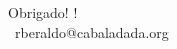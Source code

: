 
\begin{frame}[standout]
  \cerjlogo[height=2cm]\par
  \vspace{0.5em}
  Obrigado! ! \\[0.4em]
  {\small\normalfont
    \faEnvelope\ rberaldo@cabaladada.org \quad
    \faBroadcastTower\ }
\end{frame}

